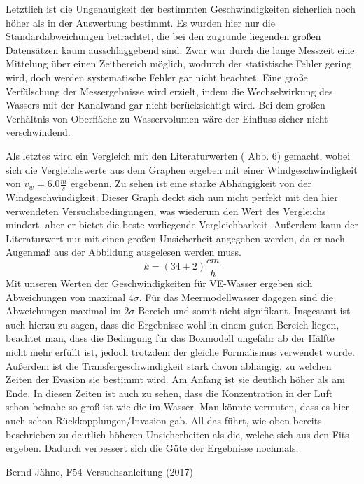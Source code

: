 \documentclass[12pt]{article}
\begin{document}
Letztlich ist die Ungenauigkeit der bestimmten Geschwindigkeiten sicherlich noch höher als in der Auswertung bestimmt. Es wurden hier nur die Standardabweichungen betrachtet, die bei den zugrunde liegenden großen Datensätzen kaum ausschlaggebend sind. Zwar war durch die lange Messzeit eine Mittelung über einen Zeitbereich möglich, wodurch der statistische Fehler gering wird, doch werden systematische Fehler gar nicht beachtet. Eine große Verfälschung der Messergebnisse wird erzielt, indem die Wechselwirkung des Wassers mit der Kanalwand gar nicht berücksichtigt wird. Bei dem großen Verhältnis von Oberfläche zu Wasservolumen wäre der Einfluss sicher nicht verschwindend. 

Als letztes wird ein Vergleich mit den Literaturwerten (\cite{jaehne} Abb. 6) gemacht, wobei sich die Vergleichswerte aus dem Graphen ergeben mit einer Windgeschwindigkeit von $v_w = 6.0 \frac{m}{s}$
ergebenn. Zu sehen ist eine starke Abhängigkeit von der Windgeschwindigkeit. Dieser Graph deckt sich nun nicht perfekt mit den hier verwendeten Versuchsbedingungen, was wiederum den Wert des Vergleichs mindert, aber er bietet die beste vorliegende Vergleichbarkeit. Außerdem kann der Literaturwert nur mit einen großen Unsicherheit angegeben werden, da er nach Augenmaß aus der Abbildung ausgelesen werden muss.
\begin{equation}
	k = (34 \pm 2) \frac{cm}{h}
\end{equation}
Mit unseren Werten der Geschwindigkeiten für VE-Wasser ergeben sich Abweichungen von maximal $4 \sigma$. Für das Meermodellwasser dagegen sind die Abweichungen maximal im $2\sigma$-Bereich und somit nicht signifikant. Insgesamt ist auch hierzu zu sagen, dass die Ergebnisse wohl in einem guten Bereich liegen, beachtet man, dass die Bedingung für das Boxmodell ungefähr ab der Hälfte nicht mehr erfüllt ist, jedoch trotzdem der gleiche Formalismus verwendet wurde. Außerdem ist die Transfergeschwindigkeit stark davon abhängig, zu welchen Zeiten der Evasion sie bestimmt wird. Am Anfang ist sie deutlich höher als am Ende. In diesen Zeiten ist auch zu sehen, dass die Konzentration in der Luft schon beinahe so groß ist wie die im Wasser. Man könnte vermuten, dass es hier auch schon Rückkopplungen/Invasion gab. All das führt, wie oben bereits beschrieben zu deutlich höheren Unsicherheiten als die, welche sich aus den Fits ergeben. Dadurch verbessert sich die Güte der Ergebnisse nochmals. 

\newpage 


\begin{thebibliography}{00}   %

 Bernd J\"ahne, F54 Versuchsanleitung (2017)

\end{thebibliography}
\end{document}
